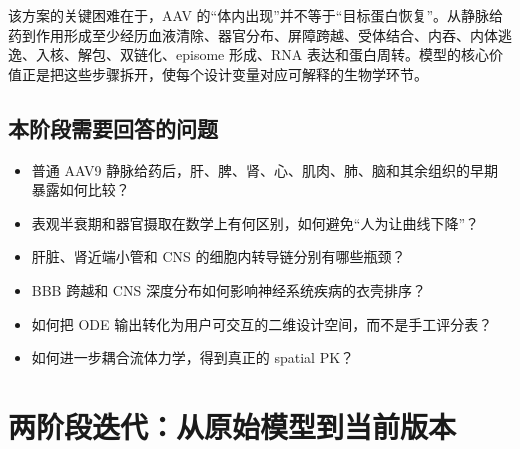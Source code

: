 \documentclass[UTF8,11pt,a4paper]{ctexart}
\begin{document}
该方案的关键困难在于，AAV 的“体内出现”并不等于“目标蛋白恢复”。从静脉给药到作用形成至少经历血液清除、器官分布、屏障跨越、受体结合、内吞、内体逃逸、入核、解包、双链化、episome 形成、RNA 表达和蛋白周转。模型的核心价值正是把这些步骤拆开，使每个设计变量对应可解释的生物学环节。

\subsection{本阶段需要回答的问题}
\begin{itemize}
  \item 普通 AAV9 静脉给药后，肝、脾、肾、心、肌肉、肺、脑和其余组织的早期暴露如何比较？
  \item 表观半衰期和器官摄取在数学上有何区别，如何避免“人为让曲线下降”？
  \item 肝脏、肾近端小管和 CNS 的细胞内转导链分别有哪些瓶颈？
  \item BBB 跨越和 CNS 深度分布如何影响神经系统疾病的衣壳排序？
  \item 如何把 ODE 输出转化为用户可交互的二维设计空间，而不是手工评分表？
  \item 如何进一步耦合流体力学，得到真正的 spatial PK？
\end{itemize}

\section{两阶段迭代：从原始模型到当前版本}
\end{document}
